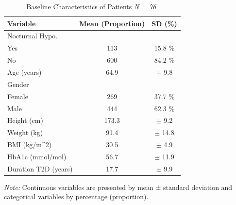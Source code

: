 \newcommand*{\MyIndent}{\hspace*{0.5cm}}
\begin{table}[tb]
  \sf\centering
  \caption{Baseline Characteristics of Patients \textit{N = 76}.}
  \begin{tabular}{lcc}
    \hline
    \textbf{Variable} & \textbf{Mean (Proportion)}  & \textbf{SD (\%)} \\
    \hline
    
    Nocturnal Hypo. \\
       \MyIndent Yes & 113 & 15.8 \% \\   
       \vspace{0.15cm}
      \MyIndent No    & 600 & 84.2 \% \\
      \vspace{0.15cm}
    Age (years)& 64.9 & $\pm$ 9.8 \\
    Gender \\
       \MyIndent Female & 269 & 37.7 \% \\   
       \vspace{0.15cm}
      \MyIndent Male    & 444 & 62.3 \% \\
      \vspace{0.15cm}
    Height (cm) & 173.3 & $\pm$ 9.2 \\
    \vspace{0.15cm}
    Weight (kg) & 91.4 & $\pm$ 14.8 \\
    \vspace{0.15cm}
    BMI (kg/m^2) & 30.5 & $\pm$ 4.9 \\
    \vspace{0.15cm}
    HbA1c (mmol/mol) & 56.7 & $\pm$ 11.9 \\ 
    \vspace{0.15cm}
    Duration T2D (years) & 17.7 & $\pm$ 9.9 \\
    \hline
    \end{tabular} %
      \label{tab:descriptives}%
    \vspace{0.25cm}
  \parbox{0.45\textwidth}{\small{\textit{Note:} Continuous variables are presented by mean ± standard deviation and categorical variables by percentage (proportion).}}
\end{table}
  
